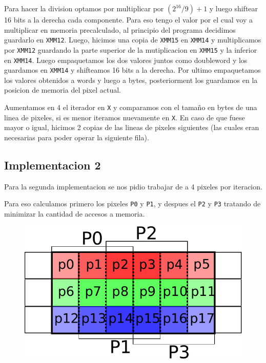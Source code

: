 Para hacer la division optamos por multiplicar por $(2^{16} / 9) + 1$ y luego shiftear 16 bits a la derecha cada componente. Para eso tengo el valor por el cual voy a multiplicar en memoria precalculado, al principio del programa decidimos guardarlo en \texttt{XMM12}.
Luego, hicimos una copia de \texttt{XMM15} en \texttt{XMM14} y multiplicamos por \texttt{XMM12} guardando la parte superior de la mutiplicacion en \texttt{XMM15} y la inferior en \texttt{XMM14}. Luego empaquetamos los dos valores juntos como doubleword y los guardamos en \texttt{XMM14} y shifteamos 16 bits a la derecha.
Por ultimo empaquetamos los valores obtenidos a words y luego a bytes, posteriorment los guardamos en la posicion de memoria del pixel actual.

Aumentamos en 4 el iterador en \texttt{X} y comparamos con el tamaño en bytes de una linea de pixeles, si es menor iteramos nuevamente en \texttt{X}. En caso de que fuese mayor o igual, hicimos 2 copias de las lineas de pixeles siguientes (las cuales eran necesarias para poder operar la siguiente fila).

\subsection{Implementacion 2}
Para la segunda implementacion se nos pidio trabajar de a 4 pixeles por iteracion.

Para eso calculamos primero los pixeles \texttt{P0} y \texttt{P1}, y despues el \texttt{P2} y \texttt{P3} tratando de minimizar la cantidad de accesos a memoria. \\

\begin{figure}[h!]
	\centering
	\includegraphics[scale=0.5]{images/BlurASM2_1}
\end{figure}


